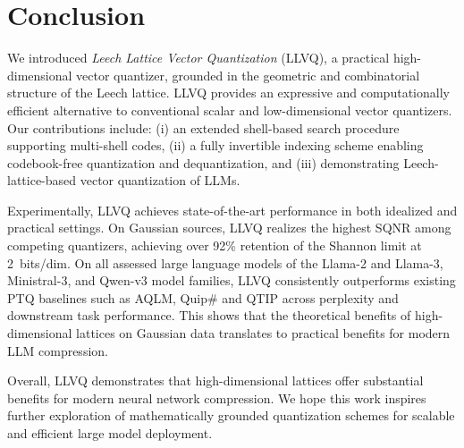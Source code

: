 \documentclass{article}
\theoremstyle{plain}
\theoremstyle{definition}
\theoremstyle{remark}
\begin{document}
\section{Conclusion}

We introduced \emph{Leech Lattice Vector Quantization} (LLVQ), a practical high-dimensional vector quantizer, grounded in the geometric and combinatorial structure of the Leech lattice. LLVQ provides an expressive and computationally efficient alternative to conventional scalar and low-dimensional vector quantizers. Our contributions include: (i) an extended shell-based search procedure supporting multi-shell codes, (ii) a fully invertible indexing scheme enabling codebook-free quantization and dequantization, and (iii) demonstrating Leech-lattice-based vector quantization of LLMs.

Experimentally, LLVQ achieves state-of-the-art performance in both idealized and practical settings. On Gaussian sources, LLVQ realizes the highest SQNR among competing quantizers, achieving over 92\% retention of the Shannon limit at 2~bits/dim. On all assessed large language models of the Llama-2 and Llama-3, Ministral-3, and Qwen-v3 model families, LLVQ consistently outperforms existing PTQ baselines such as AQLM, Quip\# and QTIP across perplexity and downstream task performance. This shows that the theoretical benefits of high-dimensional lattices on Gaussian data translates to practical benefits for modern LLM compression. 



Overall, LLVQ demonstrates that high-dimensional lattices offer substantial benefits for modern neural network compression. We hope this work inspires further exploration of mathematically grounded quantization schemes for scalable and efficient large model deployment.


\newpage




\newpage
\appendix
\onecolumn
\end{document}
